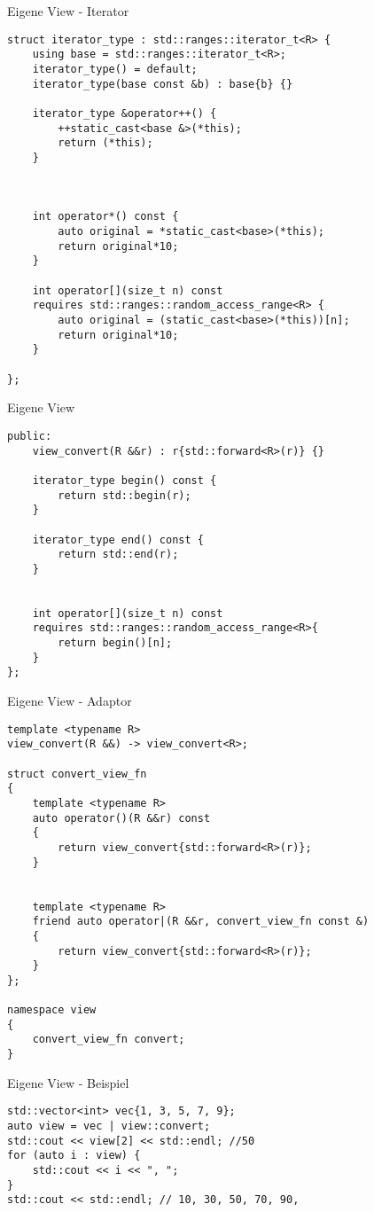 \begin{frame}{Eigene View - Iterator}
    \begin{verbatim}
struct iterator_type : std::ranges::iterator_t<R> {
    using base = std::ranges::iterator_t<R>;
    iterator_type() = default;
    iterator_type(base const &b) : base{b} {}

    iterator_type &operator++() {
        ++static_cast<base &>(*this);
        return (*this);
    }



    int operator*() const {
        auto original = *static_cast<base>(*this);
        return original*10;
    }

    int operator[](size_t n) const
    requires std::ranges::random_access_range<R> {
        auto original = (static_cast<base>(*this))[n];
        return original*10;
    }

};
    \end{verbatim}
\end{frame}

\begin{frame}{Eigene View}
    \begin{verbatim}
public:
    view_convert(R &&r) : r{std::forward<R>(r)} {}

    iterator_type begin() const {
        return std::begin(r);
    }

    iterator_type end() const {
        return std::end(r);
    }


    int operator[](size_t n) const
    requires std::ranges::random_access_range<R>{
        return begin()[n];
    }
};
    \end{verbatim}
\end{frame}

\begin{frame}{Eigene View - Adaptor}
    \begin{verbatim}
template <typename R>
view_convert(R &&) -> view_convert<R>;

struct convert_view_fn
{
    template <typename R>
    auto operator()(R &&r) const
    {
        return view_convert{std::forward<R>(r)};
    }


    template <typename R>
    friend auto operator|(R &&r, convert_view_fn const &)
    {
        return view_convert{std::forward<R>(r)};
    }
};

namespace view
{
    convert_view_fn convert;
}
    \end{verbatim}
\end{frame}

\begin{frame}{Eigene View - Beispiel}
    \begin{verbatim}
std::vector<int> vec{1, 3, 5, 7, 9};
auto view = vec | view::convert;
std::cout << view[2] << std::endl; //50
for (auto i : view) {
    std::cout << i << ", ";
}
std::cout << std::endl; // 10, 30, 50, 70, 90,
    \end{verbatim}
\end{frame}